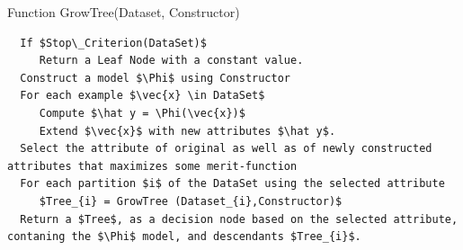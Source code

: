 

\lstset{style=customAlg}
\begin{algorithm}
	\caption{Function GrowTree(Dataset, Constructor)}
	\begin{lstlisting}
  If $Stop\_Criterion(DataSet)$
     Return a Leaf Node with a constant value.
  Construct a model $\Phi$ using Constructor
  For each example $\vec{x} \in DataSet$
     Compute $\hat y = \Phi(\vec{x})$
     Extend $\vec{x}$ with new attributes $\hat y$.
  Select the attribute of original as well as of newly constructed attributes that maximizes some merit-function
  For each partition $i$ of the DataSet using the selected attribute
     $Tree_{i} = GrowTree (Dataset_{i},Constructor)$
  Return a $Tree$, as a decision node based on the selected attribute, contaning the $\Phi$ model, and descendants $Tree_{i}$.
	\end{lstlisting}
\end{algorithm}

